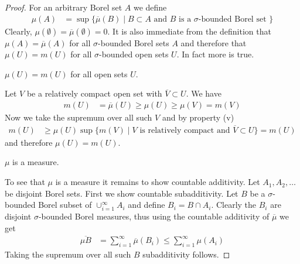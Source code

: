 \begin{proof}
For an arbitrary Borel set $A$ we define
\begin{align*}
\mu(A) &= \sup \lbrace \overline{\mu}(B) \mid B \subset A \text{ and
  $B$ is a $\sigma$-bounded Borel set } \rbrace
\end{align*}
Clearly, $\mu(\emptyset) = \overline{\mu}(\emptyset) = 0$.
It is also immediate from the definition that $\mu(A) = \overline{\mu}(A)$
for all $\sigma$-bounded Borel sets $A$ and therefore that $\mu(U) =
m(U)$ for all $\sigma$-bounded open sets $U$.  In fact more is true.

\begin{clm}$\mu(U) = m(U)$ for all open sets $U$.
\end{clm}

Let $V$ be a relatively compact open set with $\overline{V} \subset U$.  We have
\begin{align*}
m(U) &= \overline{\mu}(U) \geq \mu(U) \geq \mu(V) = m(V)
\end{align*}
Now we take the supremum over all such $V$ and by property (v) 
\begin{align*}
m(U) &\geq \mu(U) \sup \lbrace m(V) \mid V \text{ is relatively
  compact and $\overline{V} \subset U$} \rbrace = m(U)
\end{align*}
and therefore $\mu(U) = m(U)$.

\begin{clm}$\mu$ is a measure.
\end{clm}

To see that $\mu$ is a measure it remains to show countable
additivity.  Let $A_1, A_2, \dotsc$ be disjoint Borel sets.  First we
show countable subadditivity.  Let $B$ be a $\sigma$-bounded Borel
subset of $\cup_{i=1}^\infty A_i$ and define $B_i = B \cap A_i$.
Clearly the $B_i$ are disjoint $\sigma$-bounded Borel measures, thus
using the countable additivity of $\overline{\mu}$ we get
\begin{align*}
\overline{\mu{B}} &= \sum_{i=1}^\infty \overline{\mu}(B_i) \leq \sum_{i=1}^\infty \mu(A_i)
\end{align*}
Taking the supremum over all such $B$ subadditivity follows.


\end{proof}
